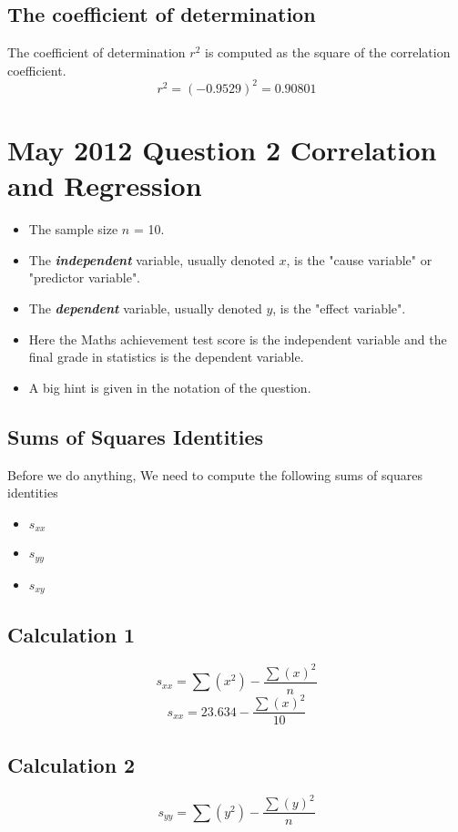 \documentclass[]{report}
\begin{document}
\subsection*{The coefficient of determination}
The coefficient of determination $r^2$ is computed as the square of the correlation coefficient.
\[r^2 = (-0.9529)^2 = 0.90801\]


\newpage
\section*{May 2012 Question 2 Correlation and Regression}
\begin{itemize}
	\item The sample size $n$ = 10.
	\item The \textbf{\textit{independent}} variable, usually denoted $x$, is the "cause variable" or "predictor variable".
	\item The \textbf{\textit{dependent}} variable, usually denoted $y$, is the "effect variable".
	\item Here the Maths achievement test score is the independent variable and the final grade in statistics is the dependent variable.
	\item A big hint is given in the notation of the question.
\end{itemize}


\subsection*{Sums of Squares Identities}
Before we do anything, We need to compute the following sums of squares identities
\begin{itemize}
	\item $s_{xx}$
	\item $s_{yy}$
	\item $s_{xy}$
\end{itemize}
\subsection*{Calculation 1}
\[ s_{xx}  = \sum(x^2) - \frac{\sum(x)^2}{n} \]
\[ s_{xx}  = 23.634 - \frac{\sum(x)^2}{10} \]

\subsection*{Calculation 2}
\[ s_{yy}  = \sum(y^2) - \frac{\sum(y)^2}{n} \]
\end{document}
